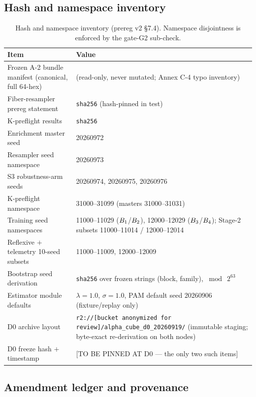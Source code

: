 \subsection{Hash and namespace inventory}
\label{app:prereg-inventory}

\begin{table}[h]
\centering
\footnotesize
\begin{tabular}{p{4.0cm}p{11.4cm}}
\toprule
Item & Value \\
\midrule
Frozen A-2 bundle manifest (canonical, full 64-hex) & \bundlemanifest{}
\newline (read-only, never mutated; Annex C-4 typo inventory) \\
Fiber-resampler prereg statement & \texttt{sha256} \resamplerhash{}
(hash-pinned in test) \\
K-preflight results & \texttt{sha256} \kpreflighthash{} \\
Enrichment master seed & 20260972 \\
Resampler seed namespace & 20260973 \\
S3 robustness-arm seeds & 20260974, 20260975, 20260976 \\
K-preflight namespace & 31000--31099 (masters 31000--31031) \\
Training seed namespaces & 11000--11029 ($B_{1}$/$B_{2}$), 12000--12029
($B_{3}$/$B_{4}$); Stage-2 subsets 11000--11014 / 12000--12014 \\
Reflexive $+$ telemetry 10-seed subsets & 11000--11009, 12000--12009 \\
Bootstrap seed derivation & \texttt{sha256} over frozen strings (block,
family), $\bmod\ 2^{63}$ \\
Estimator module defaults & $\lambda = 1.0$, $\sigma = 1.0$, PAM default
seed 20260906 (fixture/replay only) \\
D0 archive layout &
\texttt{r2://[bucket anonymized for review]/alpha\_cube\_d0\_20260919/}
(immutable staging;
byte-exact re-derivation on both nodes) \\
D0 freeze hash $+$ timestamp & [TO BE PINNED AT D0 --- the only two such
items] \\
\bottomrule
\end{tabular}
\caption{Hash and namespace inventory (prereg v2 \S7.4). Namespace
disjointness is enforced by the gate-G2 sub-check.}
\label{tab:hashes}
\end{table}

\subsection{Amendment ledger and provenance}
\label{app:prereg-amendments}

